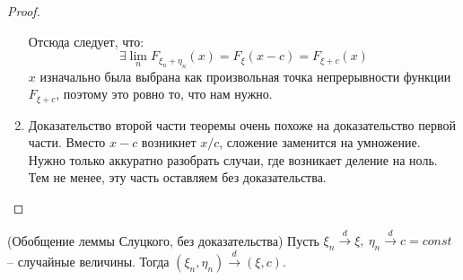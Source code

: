 \begin{proof}
\begin{enumerate}
        Отсюда следует, что:
        \[
            \exists \lim_n F_{\xi_n + \eta_n}(x) = F_\xi(x - c) = F_{\xi+c}(x)
        \]
        $x$ изначально была выбрана как произвольная точка непрерывности функции $F_{\xi+c}$, поэтому это ровно то, что нам нужно.

        \item Доказательство второй части теоремы очень похоже на доказательство первой части. Вместо $x-c$ возникнет $x/c$, сложение заменится на умножение. Нужно только аккуратно разобрать случаи, где возникает деление на ноль. Тем не менее, эту часть оставляем без доказательства.
    \end{enumerate}
\end{proof}

\begin{theorem} (Обобщение леммы Слуцкого, без доказательства)
    Пусть $\xi_n \xrightarrow{d} \xi,\ \eta_n \xrightarrow{d} c = const$ -- случайные величины. Тогда $(\xi_n, \eta_n) \xrightarrow{d} (\xi, c)$.
\end{theorem}

